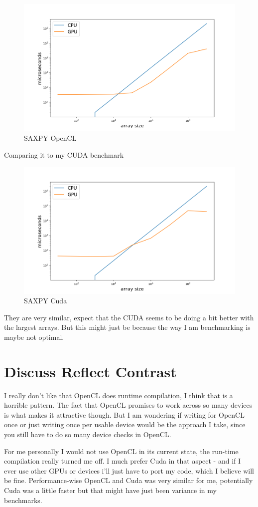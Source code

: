 \documentclass{article}
\begin{document}
\begin{figure}[H]
  \centering
  \includegraphics[width=0.95\linewidth]{ex_2/saxpy-cpu-vs-gpu.png}
  \caption{SAXPY OpenCL}
  \label{fig:}
\end{figure}

Comparing it to my CUDA benchmark

\begin{figure}[H]
  \centering
  \includegraphics[width=0.95\linewidth]{ex_2/saxpy-cpu-vs-gpu-cuda.png}
  \caption{SAXPY Cuda}
  \label{fig:}
\end{figure}

They are very similar, expect that the CUDA seems to be doing a bit better with the largest arrays. But this might just be because the way I am benchmarking is maybe not optimal.

\section{Discuss Reflect Contrast}%
\label{sec:discuss_reflect_contrast}

I really don't like that OpenCL does runtime compilation, I think that is a horrible pattern. The fact that OpenCL promises to work across so many devices is what makes it attractive though. But I am wondering if writing for
OpenCL once or just writing once per usable device would be the approach I take, since you still have to do so many device checks in OpenCL. 

For me personally I would not use OpenCL in its current state, the run-time compilation really turned me off. I much prefer Cuda in that aspect - and if I ever use other GPUs or devices i'll just have to port my code, which
I believe will be fine. Performance-wise OpenCL and Cuda was very similar for me, potentially Cuda was a little faster but that might have just been variance in my benchmarks.
\end{document}
